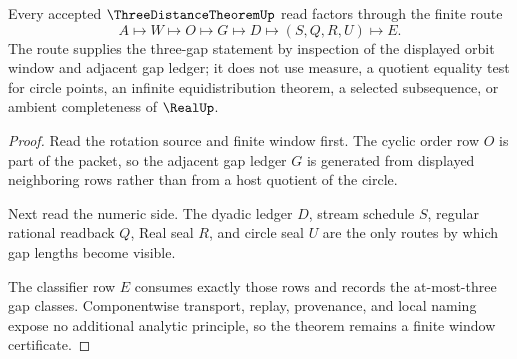 \begin{theorem}
\label{thm:three-distance-finite-window-inspection}
Every accepted $\ThreeDistanceTheoremUp$ read factors through the finite route
$$
A\longmapsto W\longmapsto O\longmapsto G\longmapsto D\longmapsto(S,Q,R,U)\longmapsto E.
$$
The route supplies the three-gap statement by inspection of the displayed orbit window and adjacent gap ledger; it does not use measure, a quotient equality test for circle points, an infinite equidistribution theorem, a selected subsequence, or ambient completeness of $\RealUp$.
\end{theorem}
\begin{proof}
Read the rotation source and finite window first. The cyclic order row $O$ is part of the packet, so the adjacent gap ledger $G$ is generated from displayed neighboring rows rather than from a host quotient of the circle.

Next read the numeric side. The dyadic ledger $D$, stream schedule $S$, regular rational readback $Q$, Real seal $R$, and circle seal $U$ are the only routes by which gap lengths become visible.

The classifier row $E$ consumes exactly those rows and records the at-most-three gap classes. Componentwise transport, replay, provenance, and local naming expose no additional analytic principle, so the theorem remains a finite window certificate.
\end{proof}




